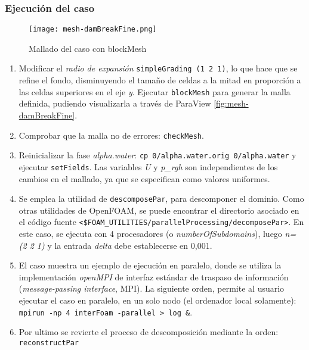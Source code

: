 \subsubsection{Ejecución del caso}\label{header-n720}

\begin{figure}
\centering
\texttt{[image: mesh-damBreakFine.png]}
\caption{Mallado del caso con blockMesh}
\label{fig:mesh-damBreakFine}
\end{figure}

\begin{enumerate}
\def\labelenumi{\arabic{enumi}.}
\item
  Modificar el \emph{radio de expansión}
  \texttt{simpleGrading\ (1\ 2\ 1)}, lo que hace que se refine el fondo,
  disminuyendo el tamaño de celdas a la mitad en proporción a las celdas
  superiores en el eje \emph{y}. Ejecutar \texttt{blockMesh} para generar la
  malla definida, pudiendo visualizarla a través de ParaView \autoref{fig:mesh-damBreakFine}.

\item
  Comprobar que la malla no de errores: \texttt{checkMesh}.
\item
  Reinicializar la fase \emph{alpha.water}:
  \texttt{cp\ 0/alpha.water.orig\ 0/alpha.water} y ejecutar
  \texttt{setFields}. Las variables \emph{U} y \emph{p\_rgh} son
  independientes de los cambios en el mallado, ya que se especifican
  como valores uniformes.
\item
  Se emplea la utilidad de \texttt{descomposePar}, para descomponer el
  dominio. Como otras utilidades de OpenFOAM, se puede encontrar el
  directorio asociado en el código fuente
  \texttt{\textless{}\$FOAM\_UTILITIES/parallelProcessing/decomposePar\textgreater{}}.
  En este caso, se ejecuta con 4 procesadores (o
  \emph{numberOfSubdomains}), luego \emph{n= (2 2 1)} y la entrada
  \emph{delta} debe establecerse en 0,001.
\item
  El caso muestra un ejemplo de ejecución en paralelo, donde se utiliza
  la implementación \emph{openMPI} de interfaz estándar de traspaso de
  información (\emph{message-passing interface}, MPI). La siguiente
  orden, permite al usuario ejecutar el caso en paralelo, en un solo
  nodo (el ordenador local solamente):
  \texttt{mpirun\ -np\ 4\ interFoam\ -parallel\ \textgreater{}\ log\ \&}.
\item
  Por ultimo se revierte el proceso de descomposición mediante la orden:
  \texttt{reconstructPar}
\end{enumerate}

